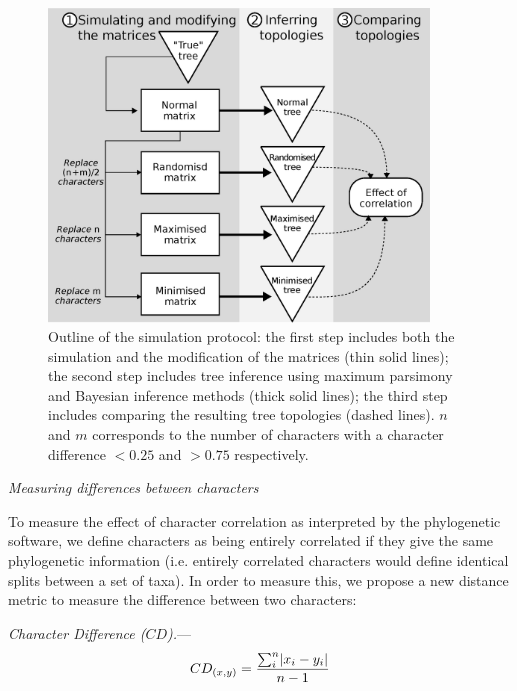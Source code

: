 \documentclass[12pt,letterpaper]{article}
\DeclarePairedDelimiter\abs{\lvert}{\rvert}%
\renewcommand{\subsection}[1]{%
\bigskip
\begin{center}
\begin{large}
\normalfont\itshape #1
\end{large}
\end{center}}
\renewcommand{\subsubsection}[1]{%
\vspace{2ex}
\noindent
\textit{#1.}---}
\begin{document}
\begin{figure}[!htbp]
\centering
   \includegraphics[width=0.9\textwidth]{outline.eps}
\caption{Outline of the simulation protocol: the first step includes both the simulation and the modification of the matrices (thin solid lines); the second step includes tree inference using maximum parsimony and Bayesian inference methods (thick solid lines); the third step includes comparing the resulting tree topologies (dashed lines). $n$ and $m$ corresponds to the number of characters with a character difference $<0.25$ and $>0.75$ respectively.}
\label{Fig:outline}
\end{figure}

\subsection{Measuring differences between characters}
\label{CDdescription}
To measure the effect of character correlation as interpreted by the phylogenetic software, we define characters as being entirely correlated if they give the same phylogenetic information (i.e. entirely correlated characters would define identical splits between a set of taxa).
In order to measure this, we propose a new distance metric to measure the difference between two characters:

\subsubsection{Character Difference ($CD$)}
\begin{equation}
    CD_{(x,y)} = \frac{\sum_{i}^{n}\abs{x_{i} - y_{i}}}{n-1}
\end{equation}
\end{document}
